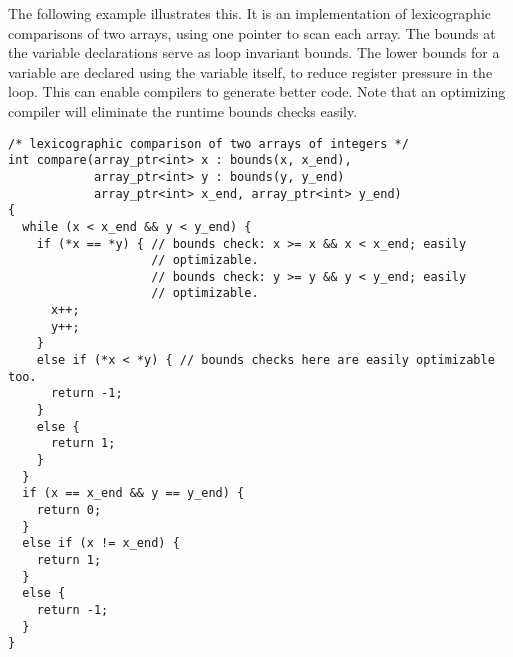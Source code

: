 The following example illustrates this. It is an implementation of
lexicographic comparisons of two arrays, using one pointer to scan each
array. The bounds at the variable declarations serve as loop invariant
bounds. The lower bounds for a variable are declared using the variable
itself, to reduce register pressure in the loop. This can enable
compilers to generate better code. Note that an optimizing compiler will
eliminate the runtime bounds checks easily.

\begin{lstlisting}
/* lexicographic comparison of two arrays of integers */
int compare(array_ptr<int> x : bounds(x, x_end),
            array_ptr<int> y : bounds(y, y_end)
            array_ptr<int> x_end, array_ptr<int> y_end)
{
  while (x < x_end && y < y_end) {
    if (*x == *y) { // bounds check: x >= x && x < x_end; easily
                    // optimizable.
                    // bounds check: y >= y && y < y_end; easily
                    // optimizable.
      x++;
      y++;
    }
    else if (*x < *y) { // bounds checks here are easily optimizable too.
      return -1;
    }
    else {
      return 1;
    }
  }
  if (x == x_end && y == y_end) {
    return 0;
  }
  else if (x != x_end) {
    return 1;
  }
  else {
    return -1;
  }
}
\end{lstlisting}

